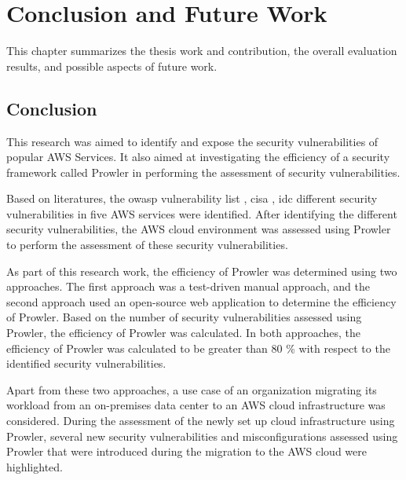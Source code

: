 
\chapter{Conclusion and Future Work}

\par This chapter summarizes the thesis work and contribution, the overall evaluation results, and possible aspects of future work.

\section{Conclusion}

\par This research was aimed to identify and expose the security vulnerabilities of popular AWS Services.
It also aimed at investigating the efficiency of a security framework called Prowler in performing the assessment of security vulnerabilities.


\par Based on literatures, the \gls{owasp} vulnerability list \cite{51}, \gls{cisa} \cite{52}, \gls{idc} \cite{53} different security vulnerabilities in five AWS services were identified.
After identifying the different security vulnerabilities, the AWS cloud environment was assessed using Prowler to perform the assessment of these security vulnerabilities.


\par As part of this research work, the efficiency of Prowler was determined using two approaches.
The first approach was a test-driven manual approach, and the second approach used an open-source web application to determine the efficiency of Prowler.
Based on the number of security vulnerabilities assessed using Prowler, the efficiency of Prowler was calculated.
In both approaches, the efficiency of Prowler was
calculated to be greater than 80 \% with respect to the identified security vulnerabilities.


\par Apart from these two approaches, a use case of
an organization migrating its workload from an on-premises data center to an AWS cloud infrastructure was considered.
During the assessment of the newly set up cloud infrastructure using Prowler, several new security vulnerabilities and misconfigurations assessed using Prowler that were introduced during the migration to the AWS cloud were highlighted.

